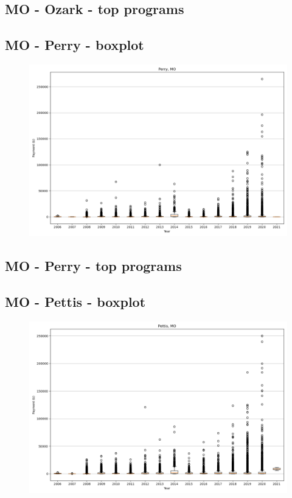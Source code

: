 \subsection*{MO - Ozark - top programs}

\newpage
\subsection*{MO - Perry - boxplot}
\begin{figure}[h]
\centering
\includegraphics[width=7in]{../output/boxplots/counties/Perry-MO_boxplot.png}
\end{figure}


\subsection*{MO - Perry - top programs}

\newpage
\subsection*{MO - Pettis - boxplot}
\begin{figure}[h]
\centering
\includegraphics[width=7in]{../output/boxplots/counties/Pettis-MO_boxplot.png}
\end{figure}


